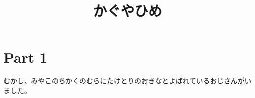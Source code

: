 \documentclass{article}
\title{かぐやひめ}
\begin{document}
\maketitle
\section*{Part 1}
むかし、みやこのちかくのむらにたけとりのおきなとよばれているおじさんがいました。
\end{document}
